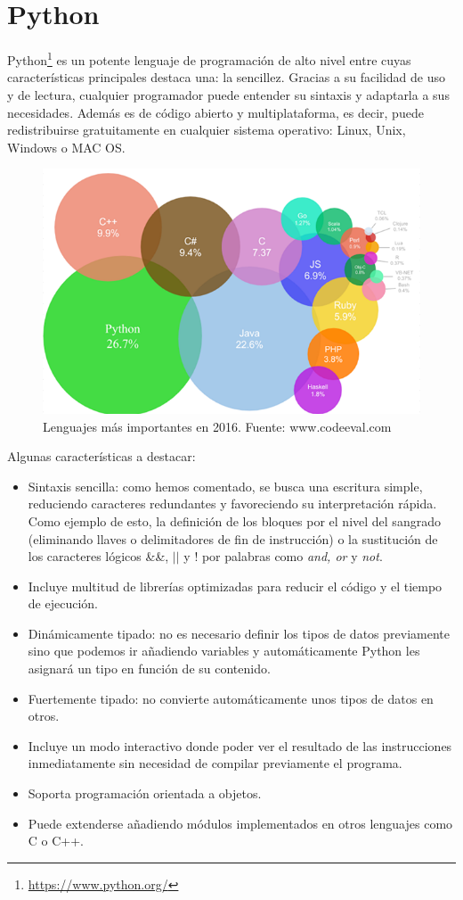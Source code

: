 \documentclass[a4paper, 12pt]{book}
\begin{document}
\section{Python} 
\label{sec:seccion2}
Python\footnote{\url{https://www.python.org/}} es un potente lenguaje de programación de alto nivel entre cuyas características principales destaca una: la sencillez. Gracias a su facilidad de uso y de lectura, cualquier programador puede entender su sintaxis y adaptarla a sus necesidades. Además es de código abierto y multiplataforma, es decir, puede redistribuirse gratuitamente en cualquier sistema operativo: Linux, Unix, Windows o MAC OS.
\begin{figure}[H]
  \centering
  \includegraphics[width=0.70\linewidth, keepaspectratio]{img/codeval2016}
  \caption{Lenguajes más importantes en 2016. Fuente: www.codeeval.com}
  \label{fig:codeval2016}
\end{figure}
Algunas características a destacar:
\begin{itemize}
	\item Sintaxis sencilla: como hemos comentado, se busca una escritura simple, reduciendo caracteres redundantes y favoreciendo su interpretación rápida. Como ejemplo de esto, la definición de los bloques por el nivel del sangrado (eliminando llaves o delimitadores de fin de instrucción) o la sustitución de los caracteres lógicos \&\&, \(\vert \vert\) y ! por palabras como \textit{and, or} y \textit{not}.   	
	\item Incluye multitud de librerías optimizadas para reducir el código y el tiempo de ejecución.
	\item Dinámicamente tipado: no es necesario definir los tipos de datos previamente sino que podemos ir añadiendo variables y automáticamente Python les asignará un tipo en función de su contenido. 
	\item Fuertemente tipado: no convierte automáticamente unos tipos de datos en otros.
	\item Incluye un modo interactivo donde poder ver el resultado de las instrucciones inmediatamente sin necesidad de compilar previamente el programa.
	\item Soporta programación orientada a objetos.
	\item Puede extenderse añadiendo módulos implementados en otros lenguajes como C o C++. 
\end{itemize}
\end{document}
